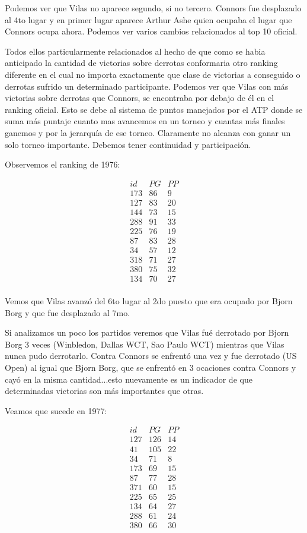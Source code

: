 Podemos ver que Vilas no aparece segundo, si no tercero. Connors fue desplazado al 4to lugar y en primer lugar aparece Arthur Ashe quien ocupaba el lugar que Connors ocupa ahora. Podemos ver varios cambios relacionados al top 10 oficial. 

Todos ellos particularmente relacionados al hecho de que como se habia anticipado la cantidad de victorias sobre derrotas conformaria otro ranking diferente en el cual no importa exactamente que clase de victorias a conseguido o derrotas sufrido un determinado participante. Podemos ver que Vilas con más victorias sobre derrotas que Connors, se encontraba por debajo de él en el ranking oficial. Esto se debe al sistema de puntos manejados por el ATP donde se suma más puntaje cuanto mas avancemos en un torneo y cuantas más finales ganemos y por la jerarquía de ese torneo. Claramente no alcanza con ganar un solo torneo importante. Debemos tener continuidad y participación.

Observemos el ranking de 1976:

\begin{eqnarray*}
id & PG & PP \\
173 & 86 & 9 \\
127 & 83 & 20 \\
144 & 73 & 15 \\
288 & 91 & 33 \\
225 & 76 & 19 \\
87 & 83 & 28 \\
34 & 57 & 12 \\
318 & 71 & 27 \\
380 & 75 & 32 \\
134 & 70 & 27 \\
\end{eqnarray*}

Vemos que Vilas avanzó del 6to lugar al 2do puesto que era ocupado por  Bjorn Borg y que fue desplazado al 7mo. 

Si analizamos un poco los partidos veremos que Vilas fué derrotado por Bjorn Borg 3 veces (Winbledon, Dallas WCT, Sao Paulo WCT) mientras que Vilas nunca pudo derrotarlo. Contra Connors se enfrentó una vez y fue derrotado (US Open) al igual que Bjorn Borg, que se enfrentó en 3 ocaciones contra Connors y cayó en la misma cantidad...esto nuevamente es un indicador de que determinadas victorias son más importantes que otras.

Veamos que sucede en 1977:

\begin{eqnarray*}
id & PG & PP \\
127 & 126 & 14 \\
41 & 105 & 22 \\
34 & 71 & 8 \\
173 & 69 & 15 \\
87 & 77 & 28 \\
371 & 60 & 15 \\
225 & 65 & 25 \\
134 & 64 & 27 \\
288 & 61 & 24 \\
380 & 66 & 30 \\
\end{eqnarray*}

